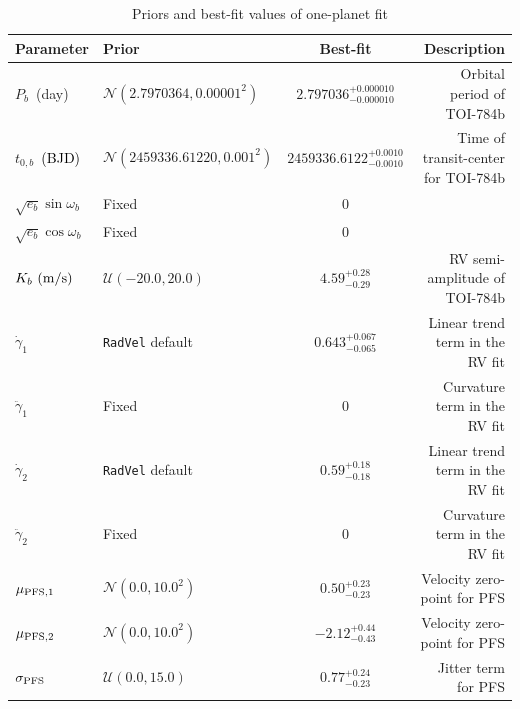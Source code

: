\documentclass[twocolumn]{aastex631}
\newcommand{\rev}[1]{\textcolor{black}{#1}}
\newcommand{\code}[1]{{\texttt{#1}}}
\begin{document}
\begin{table}
 	\centering
 	\caption{Priors and best-fit values of one-planet fit}
 	\label{tab:priors-one-planet-fit}
 	\begin{tabular}{llcr} %
 		\hline
 		\hline
		Parameter & Prior & Best-fit & Description\\
 		\hline
		$P_b$~(day) & $\mathcal{N}(2.7970364, 0.00001^2)$ & $2.797036^{+0.000010}_{-0.000010}$ & Orbital period of TOI-784b\\
		$t_{0,b}$~\rev{(BJD)} & $\mathcal{N}(2459336.61220, 0.001^2)$ & $2459336.6122^{+0.0010}_{-0.0010}$ & Time of transit-center for TOI-784b\\
		$\sqrt{e_b}\sin\omega_b$ & Fixed & 0\\
		$\sqrt{e_b}\cos\omega_b$ & Fixed & 0\\
		$K_b\ (\rm{m/s})$ & $\mathcal{U}(-20.0, 20.0)$ & $4.59^{+0.28}_{-0.29}$ & RV semi-amplitude of TOI-784b\\
		$\dot{\gamma}_1$ & \code{RadVel} default & $0.643^{+0.067}_{-0.065}$ & Linear trend term in the RV fit\\
		$\ddot{\gamma}_1$ & Fixed & 0 & Curvature term in the RV fit\\
		$\dot{\gamma}_2$ & \code{RadVel} default & $0.59^{+0.18}_{-0.18}$ & Linear trend term in the RV fit\\
		$\ddot{\gamma}_2$ & Fixed & 0 & Curvature term in the RV fit\\
		$\mu_{\rm{PFS},1}$ & $\mathcal{N}(0.0, 10.0^2)$ & $0.50^{+0.23}_{-0.23}$ & Velocity zero-point for PFS\\
		$\mu_{\rm{PFS},2}$ & $\mathcal{N}(0.0, 10.0^2)$ & $-2.12^{+0.44}_{-0.43}$ & Velocity zero-point for PFS\\
		$\sigma_{\rm{PFS}}$ & $\mathcal{U}(0.0, 15.0)$ & $0.77^{+0.24}_{-0.23}$ & Jitter term for PFS\\
 		\hline
 	\end{tabular}
\end{table}
\end{document}
